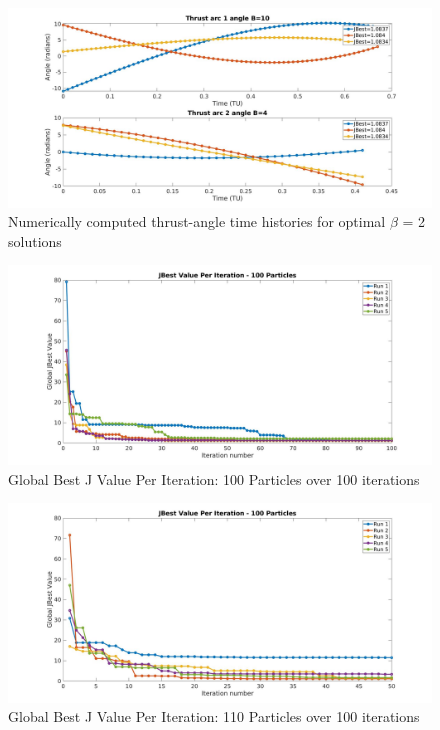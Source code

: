 \begin{figure}[H]
\includegraphics[width=\linewidth]{./jpgs/thrustAnglesB2.jpg}
\caption{Numerically computed thrust-angle time histories for optimal $\beta$ = 2 solutions  }

\end{figure}

\begin{figure}[H]
\includegraphics[width=\linewidth]{./jpgs/globalBestPerIteration100.jpg}
\caption{Global Best J Value Per Iteration: 100 Particles over 100 iterations}
\end{figure}


\begin{figure}[H]
    \includegraphics[width=\linewidth]{./jpgs/globalBestPerIteration50.jpg}
    \caption{Global Best J Value Per Iteration: 110 Particles over 100 iterations}
    \end{figure}


